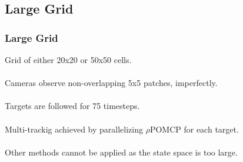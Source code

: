 \documentclass[xcolor={dvipsnames}]{beamer}
\begin{document}
\subsection{Large Grid}
\begin{frame}
    \frametitle{Large Grid}
    \begin{block}{}
        Grid of either 20x20 or 50x50 cells. \\~\\
        Cameras observe non-overlapping 5x5 patches, imperfectly. \\~\\
        Targets are followed for 75 timesteps. \\~\\
        Multi-trackig achieved by parallelizing $\rho$POMCP for each target. \\~\\
        Other methods cannot be applied as the state space is too large.
    \end{block}
\end{frame}
\end{document}
